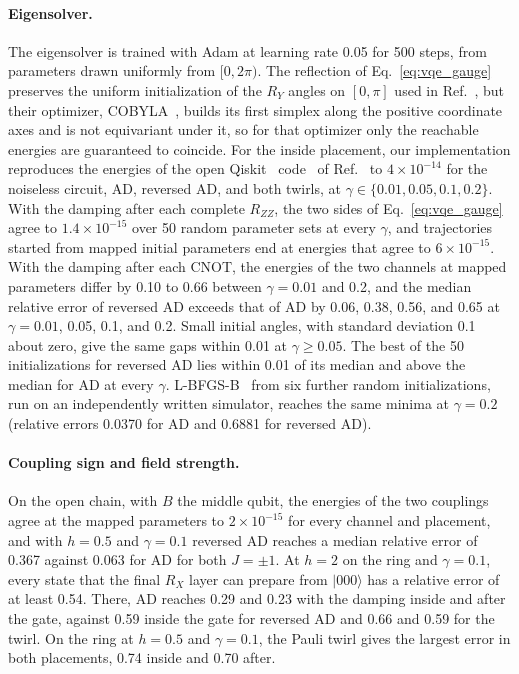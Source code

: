 \documentclass[
 aps,pra,
 twocolumn,
 superscriptaddress,
 longbibliography,
 nofootinbib
]{revtex4-2}
\providecommand{\ket}[1]{\lvert #1 \rangle}
\begin{document}
\paragraph{Eigensolver.}
The eigensolver is trained with Adam at learning rate 0.05 for 500 steps, from
parameters drawn uniformly from $[0,2\pi)$. The reflection of Eq.~\eqref{eq:vqe_gauge} preserves
the uniform initialization of the $R_Y$ angles on $[0,\pi]$ used in
Ref.~\cite{vanrossum2026biased}, but their optimizer,
COBYLA~\cite{powell1994direct}, builds its first simplex along the positive
coordinate axes and is not equivariant under it, so for that optimizer only the
reachable energies are guaranteed to coincide. For the inside placement, our
implementation reproduces the energies of the open
Qiskit~\cite{javadiabhari2024quantum} code~\cite{vanrossum2026code} of
Ref.~\cite{vanrossum2026biased} to
$4\times10^{-14}$ for the noiseless circuit, AD, reversed AD, and both twirls,
at $\gamma\in\{0.01,0.05,0.1,0.2\}$.
With the damping after each complete $R_{ZZ}$, the two
sides of Eq.~\eqref{eq:vqe_gauge} agree to $1.4\times10^{-15}$ over 50 random
parameter sets at every $\gamma$, and trajectories started from mapped initial
parameters end at energies that agree to $6\times10^{-15}$. With the damping
after each CNOT, the energies of the two channels at mapped parameters differ
by 0.10 to 0.66 between $\gamma=0.01$ and 0.2, and the median relative error of
reversed AD exceeds that of AD by 0.06, 0.38, 0.56, and 0.65 at $\gamma=0.01$,
0.05, 0.1, and 0.2. Small initial angles, with standard deviation 0.1 about zero,
give the same gaps within 0.01 at $\gamma\ge0.05$. The best of the 50
initializations for reversed AD lies within 0.01 of its median and above the
median for AD at every $\gamma$. L-BFGS-B~\cite{byrd1995limited} from six
further random initializations, run on an independently written simulator,
reaches the same minima at $\gamma=0.2$ (relative errors 0.0370 for AD and
0.6881 for reversed AD).

\paragraph{Coupling sign and field strength.}
On the open chain, with $B$ the middle qubit, the energies of the two couplings
agree at the mapped parameters to $2\times10^{-15}$ for every channel and
placement, and with $h=0.5$ and $\gamma=0.1$ reversed AD reaches a median
relative error of 0.367 against 0.063 for AD for both $J=\pm1$. At $h=2$ on the
ring and $\gamma=0.1$, every state that the final $R_X$ layer can prepare from
$\ket{000}$ has a relative error of at least 0.54. There, AD reaches 0.29 and
0.23 with the damping inside and after the gate, against 0.59 inside the gate
for reversed AD and 0.66 and 0.59 for the twirl. On the ring at $h=0.5$ and $\gamma=0.1$, the Pauli
twirl gives the largest error in both placements, 0.74 inside and 0.70 after.


\end{document}
